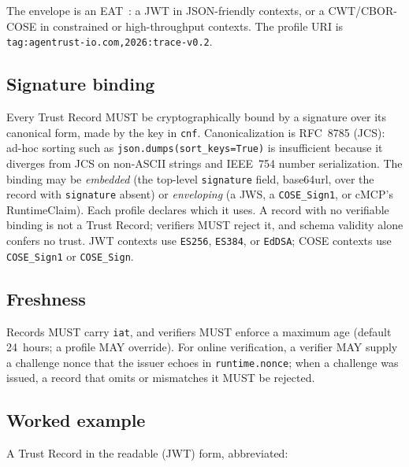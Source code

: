 The envelope is an EAT~\citep{eat2023}: a JWT in JSON-friendly contexts, or a
CWT/CBOR-COSE in constrained or high-throughput contexts. The profile URI is
\texttt{tag:agentrust-io.com,2026:trace-v0.2}.

\subsection{Signature binding}
\label{sec:model:sig}

Every Trust Record MUST be cryptographically bound by a signature over its canonical
form, made by the key in \texttt{cnf}. Canonicalization is RFC~8785 (JCS):
ad-hoc sorting such as \texttt{json.dumps(sort\_keys=True)} is insufficient because
it diverges from JCS on non-ASCII strings and IEEE~754 number serialization. The
binding may be \emph{embedded} (the top-level \texttt{signature} field, base64url, over
the record with \texttt{signature} absent) or \emph{enveloping} (a JWS, a
\texttt{COSE\_Sign1}, or cMCP's RuntimeClaim). Each profile declares which it uses.
A record with no verifiable binding is not a Trust Record; verifiers MUST reject it,
and schema validity alone confers no trust. JWT contexts use \texttt{ES256},
\texttt{ES384}, or \texttt{EdDSA}; COSE contexts use \texttt{COSE\_Sign1} or
\texttt{COSE\_Sign}.

\subsection{Freshness}

Records MUST carry \texttt{iat}, and verifiers MUST enforce a maximum age (default
24~hours; a profile MAY override). For online verification, a verifier MAY supply a
challenge nonce that the issuer echoes in \texttt{runtime.nonce}; when a challenge
was issued, a record that omits or mismatches it MUST be rejected.

\subsection{Worked example}

A Trust Record in the readable (JWT) form, abbreviated:

